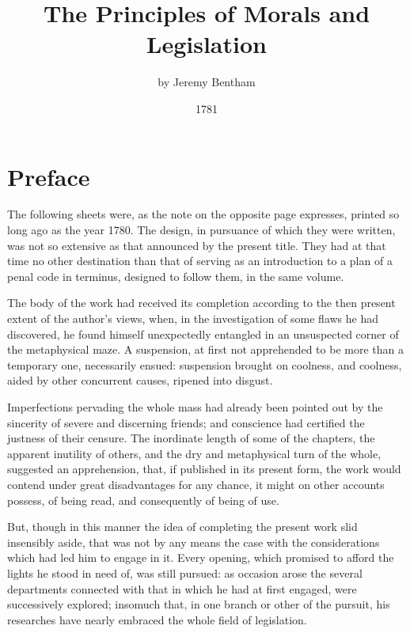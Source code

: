 \documentclass[12pt]{report}
\title{\HUGE\bfseries{The Principles of Morals and Legislation}}
\author{\Large by Jeremy Bentham}
\date{\vspace{-4mm}1781}
\begin{document}
\begin{titlepage}
    \maketitle
\end{titlepage}

\renewcommand*\contentsname{\vspace{-1cm} Table of Contents}
\tableofcontents

\chapter*{Preface}
The following sheets were, as the note on the opposite page expresses,
printed so long ago as the year 1780. The design, in pursuance of which
they were written, was not so extensive as that announced by the present
title. They had at that time no other destination than that of serving
as an introduction to a plan of a penal code in terminus, designed to
follow them, in the same volume.

The body of the work had received its completion according to the then
present extent of the author's views, when, in the investigation of some
flaws he had discovered, he found himself unexpectedly entangled in an
unsuspected corner of the metaphysical maze. A suspension, at first not
apprehended to be more than a temporary one, necessarily ensued:
suspension brought on coolness, and coolness, aided by other concurrent
causes, ripened into disgust.

Imperfections pervading the whole mass had already been pointed out by
the sincerity of severe and discerning friends; and conscience had
certified the justness of their censure. The inordinate length of some
of the chapters, the apparent inutility of others, and the dry and
metaphysical turn of the whole, suggested an apprehension, that, if
published in its present form, the work would contend under great
disadvantages for any chance, it might on other accounts possess, of
being read, and consequently of being of use.

But, though in this manner the idea of completing the present work slid
insensibly aside, that was not by any means the case with the
considerations which had led him to engage in it. Every opening, which
promised to afford the lights he stood in need of, was still pursued: as
occasion arose the several departments connected with that in which he
had at first engaged, were successively explored; insomuch that, in one
branch or other of the pursuit, his researches have nearly embraced the
whole field of legislation.
\end{document}
